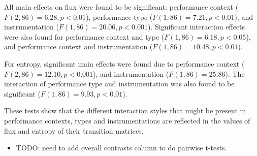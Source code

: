 \documentclass{sigchi}
\begin{document}
All main effects on flux were found to be significant: performance
context ($F(2,86) = 6.28, p < 0.01$), performance type ($F(1,86) =
7.21, p < 0.01$), and instrumentation ($F(1,86) = 20.06, p < 0.001$).
Significant interaction effects were also found for performance
context and type ($F(1,86) = 6.18, p < 0.05$), and performance context and
instrumentation ($F(1,86) = 10.48, p < 0.01$).

For entropy, significant main effects were found due to performance
context ($F(2,86) = 12.10, p < 0.001$), and instrumentation ($F(1,86)
= 25.86$). The interaction of performance type and instrumentation was
also found to be significant ($F(1,86) = 9.93, p<0.01$).

These tests show that the different interaction styles that might be
present in performance contexts, types and instrumentations are
reflected in the values of flux and entropy of their transition
matrices.

\begin{itemize}
\item TODO: need to add overall contrasts column to do pairwise t-tests.
\end{itemize}
\end{document}
